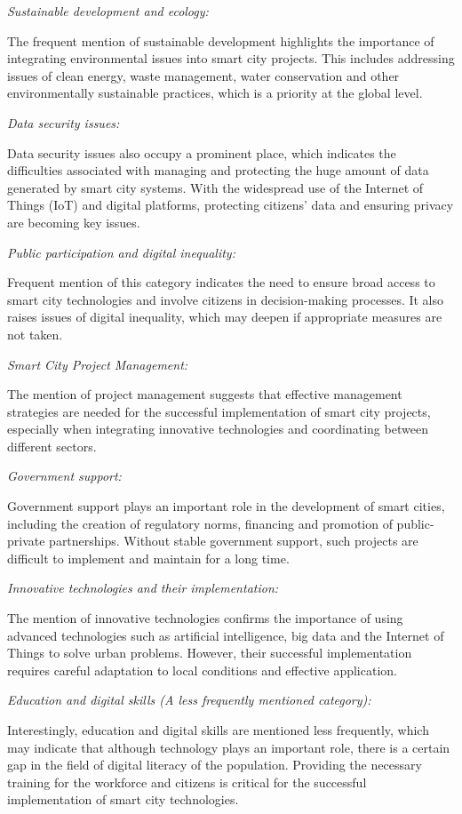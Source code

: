 \emph{Sustainable development and ecology:}

The frequent mention of sustainable development highlights the
importance of integrating environmental issues into smart city projects.
This includes addressing issues of clean energy, waste management, water
conservation and other environmentally sustainable practices, which is a
priority at the global level.

\emph{Data security issues:}

Data security issues also occupy a prominent place, which indicates the
difficulties associated with managing and protecting the huge amount of
data generated by smart city systems. With the widespread use of the
Internet of Things (IoT) and digital platforms, protecting
citizens'{} data and ensuring privacy are becoming key
issues.

\emph{Public participation and digital inequality:}

Frequent mention of this category indicates the need to ensure broad
access to smart city technologies and involve citizens in
decision-making processes. It also raises issues of digital inequality,
which may deepen if appropriate measures are not taken.

\emph{Smart City Project Management:}

The mention of project management suggests that effective management
strategies are needed for the successful implementation of smart city
projects, especially when integrating innovative technologies and
coordinating between different sectors.

\emph{Government support:}

Government support plays an important role in the development of smart
cities, including the creation of regulatory norms, financing and
promotion of public-private partnerships. Without stable government
support, such projects are difficult to implement and maintain for a
long time.

\emph{Innovative technologies and their implementation:}

The mention of innovative technologies confirms the importance of using
advanced technologies such as artificial intelligence, big data and the
Internet of Things to solve urban problems. However, their successful
implementation requires careful adaptation to local conditions and
effective application.

\emph{Education and digital skills (A less frequently mentioned
category):}

Interestingly, education and digital skills are mentioned less
frequently, which may indicate that although technology plays an
important role, there is a certain gap in the field of digital literacy
of the population. Providing the necessary training for the workforce
and citizens is critical for the successful implementation of smart city
technologies.


